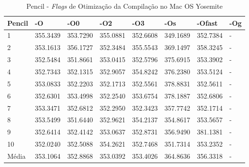 \begin{apendicesenv}
\begin{table}[!ht]
\centering
\tiny
\caption{Pencil - \textit{Flags} de Otimização da Compilação no Mac OS Yosemite}
\label{tab:otimizacao_compilacao:mac:pencil}
\begin{tabular}{llllllll}
\textbf{Pencil}         & \textbf{-O}  & \textbf{-O0}   & \textbf{-O2} & \textbf{-O3} & \textbf{-Os} & \textbf{-Ofast} & \textbf{-Og} \\ \toprule
1                       & 355.3439     &   353.7290     &    355.0881  &    352.6608  &   349.1689   &   352.7384      &  -           \\ 
2                       & 353.1613     &   356.1727     &    352.3484  &    355.5543  &   369.1497   &   358.3245      &  -           \\ 
3                       & 352.5484     &   351.8661     &    353.0415  &    352.5796  &   375.6915   &   353.3902      &  -           \\ 
4                       & 352.7343     &   352.1315     &    352.9057  &    354.8242  &   376.2380   &   353.5124      &  -           \\ 
5                       & 353.0833     &   352.2203     &    352.1713  &    352.5561  &   378.8831   &   352.5611      &  -           \\ 
6                       & 352.6301     &   353.4998     &    352.2540  &    353.6754  &   378.1887   &   352.6806      &  -           \\ 
7                       & 353.3471     &   352.6812     &    352.2950  &    352.3423  &   357.7742   &   352.1714      &  -           \\ 
8                       & 353.5499     &   351.6440     &    352.9621  &    354.2137  &   354.8617   &   353.5657      &  -           \\ 
9                       & 352.6414     &   352.4142     &    353.0637  &    352.8731  &   356.9490   &   381.1381      &  -           \\ 
10                      & 352.0240     &   352.5088     &    354.2621  &    352.7468  &   351.7314   &   353.2352      &  -           \\ \bottomrule
Média                   & 353.1064     &   352.8868     &    353.0392  &    353.4026  &   364.8636   &   356.3318      &  -           \\ 
\end{tabular}
\end{table}


\end{apendicesenv}

